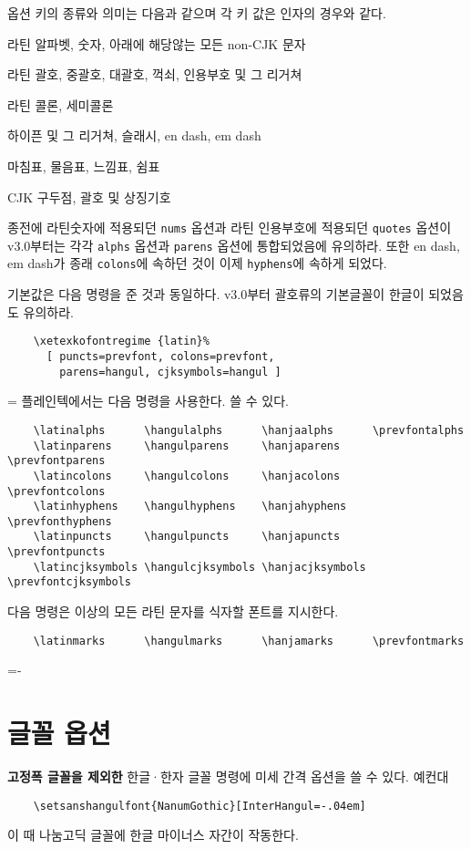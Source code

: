 \documentclass[a4paper]{article}
\def\grayvrule{{\color{white!80!black}\vrule width 2pt}}
\newenvironment{plaintex}
  {\par\medskip
    \setbox0=\vbox\bgroup\kern5pt\leftskip15pt \small
    \parindent0pt }
  {\par \kern5pt\egroup
    \dimen0=\dimexpr\pagegoal-\pagetotal\relax
    \ifdim\dimen0<\baselineskip\relax \dimen0\maxdimen \fi
    \ifdim\ht0<\dimen0
      \hbox{\grayvrule \box0}%
    \else
      \setbox2=\vsplit0 to\dimen0
      \lineskip0pt
      \ifvoid2 \else\hbox{\grayvrule \box2}\fi
      \ifvoid0 \else\hbox{\grayvrule \box0}\fi
    \fi \par\smallskip
  }
\def\hemph#1{\textsf{\bfseries #1}}
\begin{document}
옵션 키의 종류와 의미는 다음과 같으며 각 키 값은 인자의 경우와 같다.
\begin{description}\itemsep0pt
\item[alphs] 라틴 알파벳, 숫자, 아래에 해당않는 모든 non-CJK 문자
\item[parens] 라틴 괄호, 중괄호, 대괄호, 꺽쇠, 인용부호 및 그 리거쳐
\item[colons] 라틴 콜론, 세미콜론
\item[hyphens] 하이픈 및 그  리거쳐, 슬래시, en dash, em dash
\item[puncts] 마침표, 물음표, 느낌표, 쉼표
\item[cjksymbols] CJK 구두점, 괄호 및 상징기호
\end{description}

종전에
라틴숫자에 적용되던 \verb|nums| 옵션과
라틴 인용부호에 적용되던 \verb|quotes| 옵션이
v3.0부터는
각각 \verb|alphs| 옵션과 \verb|parens| 옵션에 통합되었음에 유의하라.
또한 en dash, em dash가 종래 \verb|colons|에 속하던 것이 이제
\verb|hyphens|에 속하게 되었다.

기본값은 다음 명령을 준 것과 동일하다.
v3.0부터 괄호류의 기본글꼴이 한글이 되었음도 유의하라.
\begin{verbatim}
    \xetexkofontregime {latin}%
      [ puncts=prevfont, colons=prevfont,
        parens=hangul, cjksymbols=hangul ]
\end{verbatim}
\begin{plaintex}
플레인텍에서는 다음 명령을 사용한다.  쓸 수 있다.
\begin{verbatim}
    \latinalphs      \hangulalphs      \hanjaalphs      \prevfontalphs
    \latinparens     \hangulparens     \hanjaparens     \prevfontparens
    \latincolons     \hangulcolons     \hanjacolons     \prevfontcolons
    \latinhyphens    \hangulhyphens    \hanjahyphens    \prevfonthyphens
    \latinpuncts     \hangulpuncts     \hanjapuncts     \prevfontpuncts
    \latincjksymbols \hangulcjksymbols \hanjacjksymbols \prevfontcjksymbols
\end{verbatim}
다음 명령은 이상의 모든 라틴 문자를 식자할 폰트를 지시한다.
\begin{verbatim}
    \latinmarks      \hangulmarks      \hanjamarks      \prevfontmarks
\end{verbatim}
\end{plaintex}

\section{글꼴 옵션}\label{sec:fontopts}
\hemph{고정폭 글꼴을 제외한} 한글·한자 글꼴 명령에 미세 간격 옵션을
쓸 수 있다. 예컨대
\begin{verbatim}
    \setsanshangulfont{NanumGothic}[InterHangul=-.04em]
\end{verbatim}
이 때 나눔고딕 글꼴에 한글 마이너스 자간이 작동한다.
\end{document}
